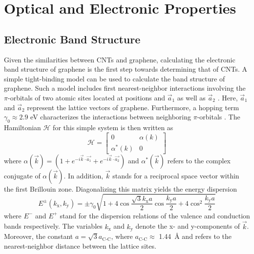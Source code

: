 \section{Optical and Electronic Properties}

\subsection{Electronic Band Structure}

Given the similarities between CNTs and graphene, calculating the electronic band structure of graphene is the first step towards determining that of CNTs. A simple tight-binding model can be used to calculate the band structure of graphene. Such a model includes first nearest-neighbor interactions involving the $\pi$-orbitals of two atomic sites located at positions and $\vec{a}_1$ as well as $\vec{a}_2$ \cite{charlier2007electronic}. Here, $\vec{a}_1$ and $\vec{a}_2$ represent the lattice vectors of graphene. Furthermore, a hopping term $\gamma_0 \approx 2.9$ eV  characterizes the interactions between neighboring $\pi$-orbitals \cite{charlier2007electronic}. The Hamiltonian $\mathcal{H}$ for this simple system is then written as
%
\begin{equation}
	\mathcal{H} = \begin{bmatrix} 
	0 & \alpha(k) \\
	\alpha^*(k) & 0
	\end{bmatrix}
\end{equation}
%
where $\alpha(\vec{k}) = (1 + e^{-i \vec{k}\cdot \vec{a_1}} + e^{-i \vec{k}\cdot \vec{a_2}})$ and $\alpha^*(\vec{k})$ refers to the complex conjugate of $\alpha(\vec{k})$\cite{charlier2007electronic}. In addition, $\vec{k}$ stands for a reciprocal space vector within the first Brillouin zone. Diagonalizing this matrix yields the energy dispersion
% 
\begin{equation}
	E^{\pm} (k_\text{x}, k_\text{y}) = \pm \gamma_0 \sqrt{1 + 4 \cos\dfrac{\sqrt{3}k_\text{x} a}{2}\cos\dfrac{k_\text{y} a}{2} + 4 \cos^2 \dfrac{k_\text{y} a}{2}}
	\label{eq:graphene_band}
\end{equation} 
 where $E^-$ and $E^+$ stand for the dispersion relations of the valence and conduction bands respectively. The variables $k_\text{x}$ and $k_\text{y}$ denote the x- and y-components of $\vec{k}$. Moreover, the constant $a = \sqrt{3}a_\text{C-C}$, where $a_\text{C-C} \approx$ \SI{1.44}{\angstrom} and refers to the nearest-neighbor distance between the lattice sites. 
%
